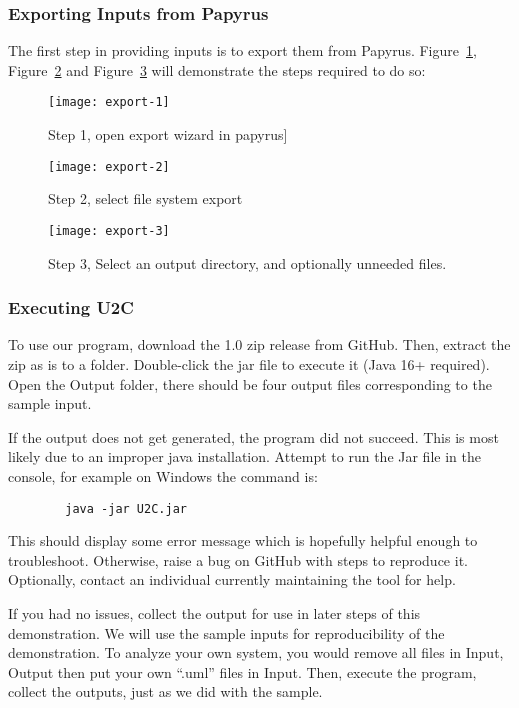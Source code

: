     \subsubsection{Exporting Inputs from Papyrus}
    The first step in providing inputs is to export them from Papyrus.
    Figure~\ref{fig:export-1}, Figure~\ref{fig:export-2} and Figure~\ref{fig:export-3} will demonstrate the steps required to do so:
    \begin{figure}[h]
        \centering
        \texttt{[image: export-1]}
        \caption{Step 1, open export wizard in papyrus]}
        \label{fig:export-1}
    \end{figure}
    \begin{figure}[h]
        \centering
        \texttt{[image: export-2]}
        \caption{Step 2, select file system export}
        \label{fig:export-2}
    \end{figure}
    \begin{figure}[h]
        \centering
        \texttt{[image: export-3]}
        \caption{Step 3, Select an output directory, and optionally unneeded files.}
        \label{fig:export-3}
    \end{figure}

    \newpage
    \subsubsection{Executing U2C}\label{subsubsec:exec}
    To use our program, download the 1.0 zip release from GitHub. %
    Then, extract the zip as is to a folder.
    Double-click the jar file to execute it (Java 16+ required).
    Open the Output folder, there should be four output files corresponding to the sample input.

    If the output does not get generated, the program did not succeed.
    This is most likely due to an improper java installation.
    Attempt to run the Jar file in the console, for example on Windows the command is:
    \begin{verbatim}
        java -jar U2C.jar
    \end{verbatim}
    This should display some error message which is hopefully helpful enough to troubleshoot.
    Otherwise, raise a bug on GitHub with steps to reproduce it.
    Optionally, contact an individual currently maintaining the tool for help.

    If you had no issues, collect the output for use in later steps of this demonstration.
    We will use the sample inputs for reproducibility of the demonstration.
    To analyze your own system, you would remove all files in Input, Output then put your own ``.uml'' files in Input.
    Then, execute the program, collect the outputs, just as we did with the sample.

